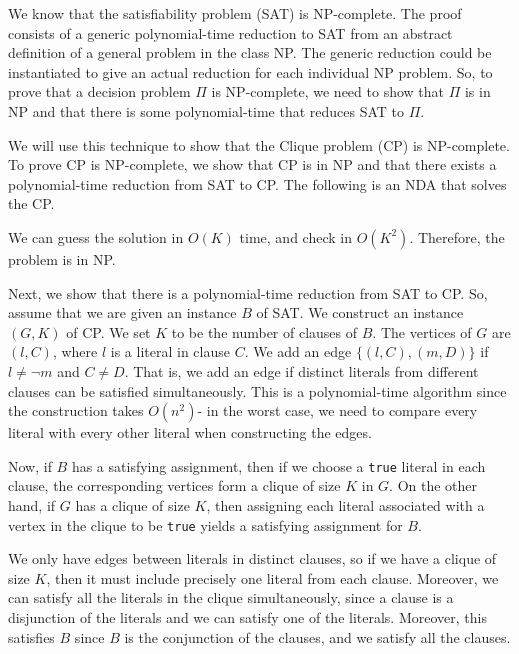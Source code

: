 \documentclass[a4paper, openany]{memoir}
\begin{document}
We know that the satisfiability problem (SAT) is NP-complete. The proof consists of a generic polynomial-time reduction to SAT from an abstract definition of a general problem in the class NP. The generic reduction could be instantiated to give an actual reduction for each individual NP problem. So, to prove that a decision problem $\Pi$ is NP-complete, we need to show that $\Pi$ is in NP and that there is some polynomial-time that reduces SAT to $\Pi$.

We will use this technique to show that the Clique problem (CP) is NP-complete. To prove CP is NP-complete, we show that CP is in NP and that there exists a polynomial-time reduction from SAT to CP. The following is an NDA that solves the CP.

We can guess the solution in $O(K)$ time, and check in $O(K^2)$. Therefore, the problem is in NP.

Next, we show that there is a polynomial-time reduction from SAT to CP. So, assume that we are given an instance $B$ of SAT. We construct an instance $(G, K)$ of CP. We set $K$ to be the number of clauses of $B$. The vertices of $G$ are $(l, C)$, where $l$ is a literal in clause $C$. We add an edge $\{(l, C), (m, D)\}$ if $l \neq \lnot m$ and $C \neq D$. That is, we add an edge if distinct literals from different clauses can be satisfied simultaneously. This is a polynomial-time algorithm since the construction takes $O(n^2)$- in the worst case, we need to compare every literal with every other literal when constructing the edges.

Now, if $B$ has a satisfying assignment, then if we choose a \texttt{true} literal in each clause, the corresponding vertices form a clique of size $K$ in $G$. On the other hand, if $G$ has a clique of size $K$, then assigning each literal associated with a vertex in the clique to be \texttt{true} yields a satisfying assignment for $B$. 

We only have edges between literals in distinct clauses, so if we have a clique of size $K$, then it must include precisely one literal from each clause. Moreover, we can satisfy all the literals in the clique simultaneously, since a clause is a disjunction of the literals and we can satisfy one of the literals. Moreover, this satisfies $B$ since $B$ is the conjunction of the clauses, and we satisfy all the clauses.
\end{document}
